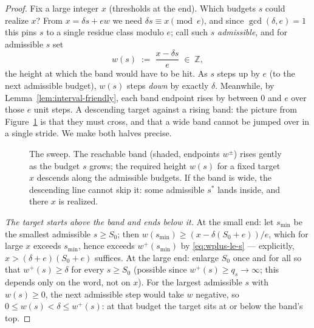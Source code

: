 \documentclass[11pt,reqno]{amsart}
\theoremstyle{plain}
\theoremstyle{definition}
\theoremstyle{remark}
\newcommand{\ZZ}{\mathbb{Z}}
\begin{document}
\begin{proof}
Fix a large integer $x$ (thresholds at the end). Which budgets $s$ could realize
$x$? From $x = \delta s + e w$ we need $\delta s \equiv x \pmod e$, and since
$\gcd(\delta, e) = 1$ this pins $s$ to a single residue class modulo $e$; call such
$s$ \emph{admissible}, and for admissible $s$ set
\[
  w(s) \;:=\; \frac{x - \delta s}{e} \;\in\; \ZZ ,
\]
the height at which the band would have to be hit. As $s$ steps up by $e$ (to the
next admissible budget), $w(s)$ steps \emph{down} by exactly $\delta$. Meanwhile,
by Lemma~\ref{lem:interval-friendly}, each band endpoint rises by between $0$ and
$e$ over those $e$ unit steps. A descending target against a rising band: the
picture from Figure~\ref{fig:sweep-friendly} is that they must cross, and that a
wide band cannot be jumped over in a single stride. We make both halves precise.

\begin{figure}[t]
\centering
{}
\caption{The sweep. The reachable band (shaded, endpoints $w^\pm$) rises gently as
the budget $s$ grows; the required height $w(s)$ for a fixed target $x$ descends
along the admissible budgets. If the band is wide, the descending line cannot skip
it: some admissible $s^*$ lands inside, and there $x$ is realized.}
\label{fig:sweep-friendly}
\end{figure}

\emph{The target starts above the band and ends below it.} At the small end: let
$s_{\min}$ be the smallest admissible $s \ge S_0$; then $w(s_{\min}) \ge
(x - \delta(S_0 + e))/e$, which for large $x$ exceeds $s_{\min}$, hence exceeds
$w^+(s_{\min})$ by \eqref{eq:wplus-le-s} --- explicitly, $x > (\delta + e)(S_0 + e)$
suffices. At the large end: enlarge $S_0$ once and for all so that $w^+(s) \ge \delta$ for
every $s \ge S_0$ (possible since $w^+(s) \ge q_s \to \infty$; this depends only on
the word, not on $x$). For the largest admissible $s$ with $w(s) \ge 0$, the next
admissible step would take $w$ negative, so $0 \le w(s) < \delta \le w^+(s)$: at
that budget the target sits at or below the band's top.


\end{proof}
\end{document}
